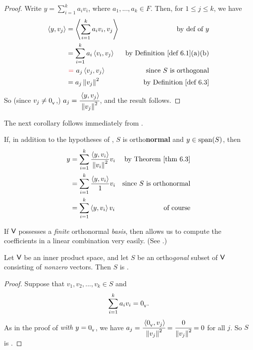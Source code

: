 \begin{proof}
Write \(y = \sum_{i = 1}^k a_i v_i\), where \(a_1, ..., a_k \in F\).
Then, for \(1 \le j \le k\), we have
\begin{align*}
    \LG y, v_j \RG & = \LG \sum_{i = 1}^k a_i v_i, v_j \RG & \text{by def of \(y\)} \\
        & = \sum_{i = 1}^k a_i \LG v_i, v_j \RG & \text{by \DEF{6.1}(a)(b)} \\
        & \ \RED{=} \ a_j \LG v_j, v_j \RG & \text{since \(S\) is orthogonal} \\
        & = a_j \norm{v_j}^2 & \text{by \DEF{6.3}}
\end{align*}
So (since \(v_j \ne 0_{_{\textsf{V}}}\),) \(a_j = \cfrac{\left< y, v_j \right>}{\left\lVert v_j\right\rVert^2}\), and the result follows.
\end{proof}

The next corollary follows immediately from .

\begin{corollary} \label{corollary 6.3.1}
If, in addition to the hypotheses of , \(S\) is ortho\textbf{normal} and \(y \in \operatorname{span}(S)\), then
\begin{align*}
    y & = \sum_{i = 1}^k \frac{\LG y, v_i \RG}{\norm{v_i}^2} v_i & \text{by \THM{6.3}} \\
      & = \sum_{i = 1}^k \frac{\LG y, v_i \RG}{1} v_i & \text{since \(S\) is orthonormal} \\
      & = \sum_{i = 1}^k \LG y, v_i \RG v_i & \text{of course}
\end{align*}
\end{corollary}

\begin{note}
If \(\textsf{V}\) possesses a \emph{finite} orthonormal \emph{basis}, then  allows us to compute the coefficients in a linear combination very easily.
(See .)
\end{note}

\begin{corollary} \label{corollary 6.3.2}
Let \(\textsf{V}\) be an inner product space, and let \(S\) be an ortho\emph{gonal} subset of \(\textsf{V}\) consisting of \emph{nonzero} vectors.
Then \(S\) is \emph{\LID{}}.
\end{corollary}

\begin{proof}
Suppose that \(v_1, v_2, ..., v_k \in S\) and
\[
    \sum_{i = 1}^k a_i v_i = 0_{_{\textsf{V}}}.
\]
As in the proof of  \emph{with \(y = 0_{_{\textsf{V}}}\)}, we have \(a_j = \cfrac{\left< 0_{_{\textsf{V}}}, v_j \right>}{\left\lVert v_j\right\rVert^2} = \cfrac{0}{\left\lVert v_j\right\rVert^2} = 0\) for all \(j\).
So \(S\) is \LID{}.
\end{proof}

